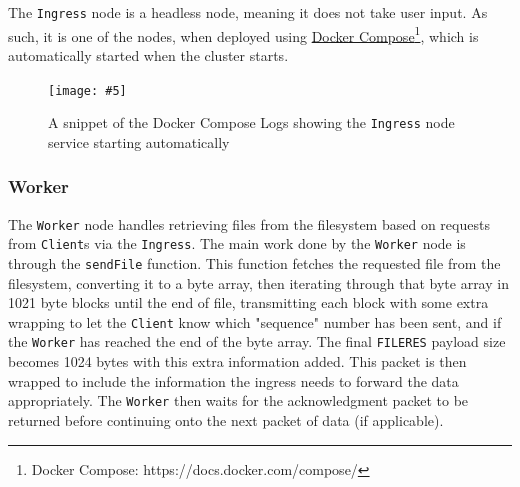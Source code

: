 \documentclass{article}
\newcommand{\includescalefigure}[5]{
\begin{figure}[htb]
\centering
\texttt{[image: \#5]}
\captionsetup{width=.8\linewidth} 
\caption[#2]{#3}
\label{#1}
\end{figure}
}
\newcommand{\code}[1]{\texttt{#1}}
\begin{document}
The \code{Ingress} node is a headless node, meaning it does not take user input. As such, it is one of the nodes, when deployed using \href{https://docs.docker.com/compose/}{Docker Compose}\footnote{Docker Compose: https://docs.docker.com/compose/}, which is automatically started when the cluster starts. 
\includescalefigure{fig:ingress_start_log}{Start log of \code{Ingress} Node}{A snippet of the Docker Compose Logs showing the \code{Ingress} node service starting automatically}{1}{ingress_start_log.png}

\subsubsection{Worker}
\label{subsec:Worker}
The \code{Worker} node handles retrieving files from the filesystem based on requests from \code{Client}s via the \code{Ingress}. The main work done by the \code{Worker} node is through the \code{sendFile} function. This function fetches the requested file from the filesystem, converting it to a byte array, then iterating through that byte array in 1021 byte blocks until the end of file, transmitting each block with some extra wrapping to let the \code{Client} know which "sequence" number has been sent, and if the \code{Worker} has reached the end of the byte array. The final \code{FILERES} payload size becomes 1024 bytes with this extra information added. This packet is then wrapped to include the information the ingress needs to forward the data appropriately. The \code{Worker} then waits for the acknowledgment packet to be returned before continuing onto the next packet of data (if applicable).

	
	
	
\end{document}

